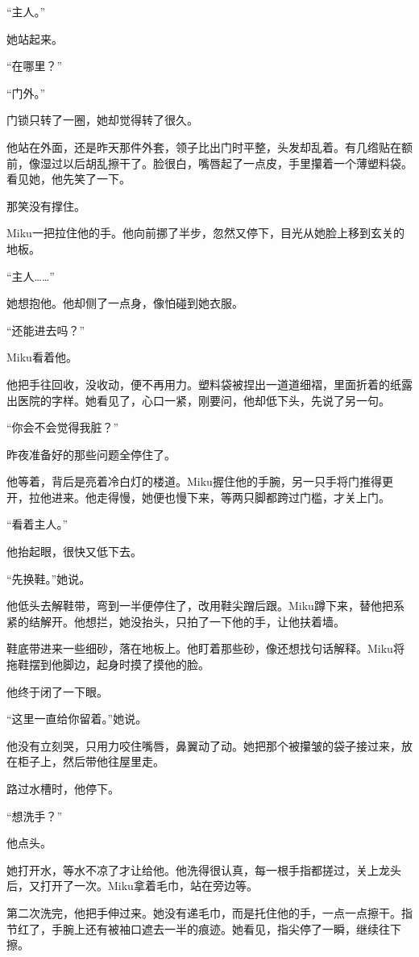“主人。”

她站起来。

“在哪里？”

“门外。”

\SceneBreak

门锁只转了一圈，她却觉得转了很久。

他站在外面，还是昨天那件外套，领子比出门时平整，头发却乱着。有几绺贴在额前，像湿过以后胡乱擦干了。脸很白，嘴唇起了一点皮，手里攥着一个薄塑料袋。看见她，他先笑了一下。

那笑没有撑住。

Miku一把拉住他的手。他向前挪了半步，忽然又停下，目光从她脸上移到玄关的地板。

“主人……”

她想抱他。他却侧了一点身，像怕碰到她衣服。

“还能进去吗？”

Miku看着他。

他把手往回收，没收动，便不再用力。塑料袋被捏出一道道细褶，里面折着的纸露出医院的字样。她看见了，心口一紧，刚要问，他却低下头，先说了另一句。

“你会不会觉得我脏？”

昨夜准备好的那些问题全停住了。

他等着，背后是亮着冷白灯的楼道。Miku握住他的手腕，另一只手将门推得更开，拉他进来。他走得慢，她便也慢下来，等两只脚都跨过门槛，才关上门。

“看着主人。”

他抬起眼，很快又低下去。

“先换鞋。”她说。

他低头去解鞋带，弯到一半便停住了，改用鞋尖蹭后跟。Miku蹲下来，替他把系紧的结解开。他想拦，她没抬头，只拍了一下他的手，让他扶着墙。

鞋底带进来一些细砂，落在地板上。他盯着那些砂，像还想找句话解释。Miku将拖鞋摆到他脚边，起身时摸了摸他的脸。

他终于闭了一下眼。

“这里一直给你留着。”她说。

他没有立刻哭，只用力咬住嘴唇，鼻翼动了动。她把那个被攥皱的袋子接过来，放在柜子上，然后带他往屋里走。

路过水槽时，他停下。

“想洗手？”

他点头。

她打开水，等水不凉了才让给他。他洗得很认真，每一根手指都搓过，关上龙头后，又打开了一次。Miku拿着毛巾，站在旁边等。

第二次洗完，他把手伸过来。她没有递毛巾，而是托住他的手，一点一点擦干。指节红了，手腕上还有被袖口遮去一半的痕迹。她看见，指尖停了一瞬，继续往下擦。

